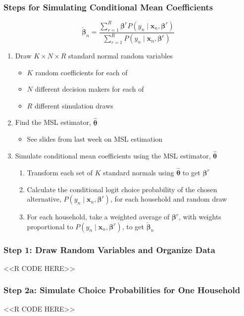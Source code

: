 \documentclass{beamer}
\begin{document}
\begin{frame}\frametitle{Steps for Simulating Conditional Mean Coefficients}
    $$\check{\bm{\beta}}_n = \frac{\sum_{r = 1}^R \bm{\beta}^r P(y_n \mid \bm{x}_n, \bm{\beta}^r)}{\sum_{r = 1}^R P(y_n \mid \bm{x}_n, \bm{\beta}^r)}$$
    \begin{enumerate}
        \item Draw $K \times N \times R$ standard normal random variables
        \begin{itemize}
            \item $K$ random coefficients for each of
            \item $N$ different decision makers for each of
            \item $R$ different simulation draws
        \end{itemize}
        \item Find the MSL estimator, $\widehat{\bm{\theta}}$
        \begin{itemize}
            \item See slides from last week on MSL estimation
        \end{itemize}
        \item Simulate conditional mean coefficients using the MSL estimator, $\widehat{\bm{\theta}}$
        \begin{enumerate}
            \item Transform each set of $K$ standard normals using $\widehat{\bm{\theta}}$ to get $\bm{\beta}^r$
            \item Calculate the conditional logit choice probability of the chosen alternative, $P(y_n \mid \bm{x}_n, \bm{\beta}^r)$, for each household and random draw
            \item For each household, take a weighted average of $\bm{\beta}^r$, with weights proportional to $P(y_n \mid \bm{x}_n, \bm{\beta}^r)$, to get $\check{\bm{\beta}}_n$
        \end{enumerate}
    \end{enumerate}
\end{frame}

\begin{frame}[fragile]\frametitle{Step 1: Draw Random Variables and Organize Data}
    <<R CODE HERE>>
\end{frame}

\begin{frame}[fragile]\frametitle{Step 2a: Simulate Choice Probabilities for One Household}
    <<R CODE HERE>>
\end{frame}
\end{document}
